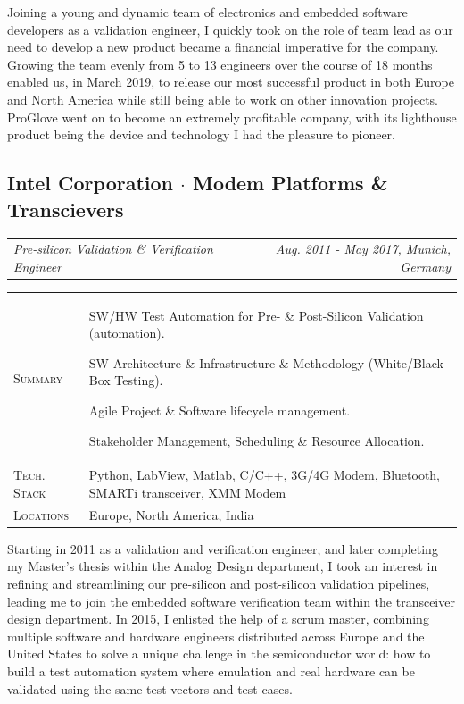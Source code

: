 \documentclass[10pt,a4paper]{moderncv}
\newcommand*{\makecareersubsection}[5]{
  \subsection{#1 {\color{color2}$\cdot$ #2}}
  \addvspace{-0.5em}
  {\color{color2}
  \begin{tabularx}{\textwidth}{LR}
    {\itshape #3} & {\itshape #4, #5}
  \end{tabularx}}
  \par\addvspace{1em}
  }
\begin{document}
  Joining a young and dynamic team of electronics and embedded software developers as a validation engineer, I quickly took on the role of team lead as our need to develop a new product became a financial imperative for the company. Growing the team evenly from 5 to 13 engineers over the course of 18 months enabled us, in March 2019, to release our most successful product in both Europe and North America while still being able to work on other innovation projects. ProGlove went on to become an extremely profitable company, with its lighthouse product being the device and technology I had the pleasure to pioneer.

\vspace{0.75em}

\makecareersubsection{Intel Corporation}{Modem Platforms \& Transcievers}
  {Pre-silicon Validation \& Verification Engineer}
  {Aug. 2011 - May 2017}
  {Munich, Germany}


  \vspace{1.5em}

  \begin{tabularx}{\textwidth}{>{\scshape}l@{\hskip 3.5mm}L}
    Summary & SW/HW Test Automation for Pre- \& Post-Silicon Validation (automation).
    \par SW Architecture \& Infrastructure \& Methodology (White/Black Box Testing).
    \par Agile Project \& Software lifecycle management. 
    \par Stakeholder Management, Scheduling \& Resource Allocation.\\
    Tech. Stack & Python, LabView, Matlab, C/C++, 3G/4G Modem, Bluetooth, SMARTi transceiver, XMM Modem\\
    Locations & Europe, North America, India\\
  \end{tabularx}

  \vspace{1.5em}

  Starting in 2011 as a validation and verification engineer, and later completing my Master's thesis within the Analog Design department, I took an interest in refining and streamlining our pre-silicon and post-silicon validation pipelines, leading me to join the embedded software verification team within the transceiver design department. In 2015, I enlisted the help of a scrum master, combining multiple software and hardware engineers distributed across Europe and the United States to solve a unique challenge in the semiconductor world: how to build a test automation system where emulation and real hardware can be validated using the same test vectors and test cases.
\end{document}
